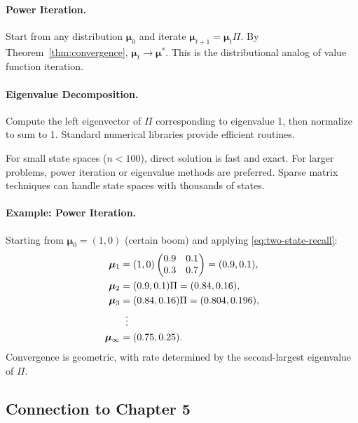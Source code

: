 \paragraph{Power Iteration.}
Start from any distribution $\boldsymbol{\mu}_0$ and iterate $\boldsymbol{\mu}_{t+1} = \boldsymbol{\mu}_t \Pi$. By Theorem~\ref{thm:convergence}, $\boldsymbol{\mu}_t \to \boldsymbol{\mu}^*$. This is the distributional analog of value function iteration.

\paragraph{Eigenvalue Decomposition.}
Compute the left eigenvector of $\Pi$ corresponding to eigenvalue 1, then normalize to sum to 1. Standard numerical libraries provide efficient routines.

\begin{callouttip}
For small state spaces ($n < 100$), direct solution is fast and exact. For larger problems, power iteration or eigenvalue methods are preferred. Sparse matrix techniques can handle state spaces with thousands of states.
\end{callouttip}

\paragraph{Example: Power Iteration.}
Starting from $\boldsymbol{\mu}_0 = (1, 0)$ (certain boom) and applying \eqref{eq:two-state-recall}:
\begin{align}
\boldsymbol{\mu}_1 &= (1, 0) \begin{pmatrix} 0.9 & 0.1 \\ 0.3 & 0.7 \end{pmatrix} = (0.9, 0.1), \\
\boldsymbol{\mu}_2 &= (0.9, 0.1) \Pi = (0.84, 0.16), \\
\boldsymbol{\mu}_3 &= (0.84, 0.16) \Pi = (0.804, 0.196), \\
&\;\;\vdots \notag \\
\boldsymbol{\mu}_\infty &= (0.75, 0.25).
\end{align}
Convergence is geometric, with rate determined by the second-largest eigenvalue of $\Pi$.

\subsection{Connection to Chapter 5}
\label{subsec:connection-chapter5}

